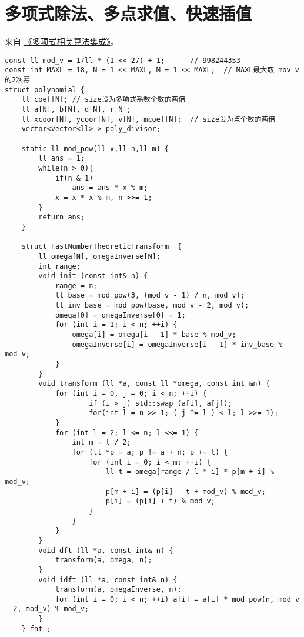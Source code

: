 \section{多项式除法、多点求值、快速插值}

\par 来自 \href{https://brooksj.com/2019/07/24/%E5%A4%9A%E9%A1%B9%E5%BC%8F%E7%9B%B8%E5%85%B3%E7%AE%97%E6%B3%95%E9%9B%86%E6%88%90/}{《多项式相关算法集成》}。

\begin{verbatim}
const ll mod_v = 17ll * (1 << 27) + 1;      // 998244353
const int MAXL = 18, N = 1 << MAXL, M = 1 << MAXL;  // MAXL最大取 mov_v 的2次幂
struct polynomial {
​    ll coef[N]; // size设为多项式系数个数的两倍
​    ll a[N], b[N], d[N], r[N];
​    ll xcoor[N], ycoor[N], v[N], mcoef[N];  // size设为点个数的两倍
​    vector<vector<ll> > poly_divisor;
​     
​    static ll mod_pow(ll x,ll n,ll m) {
​        ll ans = 1;
​        while(n > 0){
​            if(n & 1)
​                ans = ans * x % m;
​            x = x * x % m, n >>= 1;
​        }
​        return ans;
​    }
​     
​    struct FastNumberTheoreticTransform  {
​        ll omega[N], omegaInverse[N];
​        int range;
​        void init (const int& n) {
​            range = n;
​            ll base = mod_pow(3, (mod_v - 1) / n, mod_v);
​            ll inv_base = mod_pow(base, mod_v - 2, mod_v);
​            omega[0] = omegaInverse[0] = 1;
​            for (int i = 1; i < n; ++i) {
​                omega[i] = omega[i - 1] * base % mod_v;
​                omegaInverse[i] = omegaInverse[i - 1] * inv_base % mod_v;
​            }
​        }
​        void transform (ll *a, const ll *omega, const int &n) {
​            for (int i = 0, j = 0; i < n; ++i) {
​                    if (i > j) std::swap (a[i], a[j]);
​                    for(int l = n >> 1; ( j ^= l ) < l; l >>= 1);
​            }
​            for (int l = 2; l <= n; l <<= 1) {
​                int m = l / 2;
​                for (ll *p = a; p != a + n; p += l) {
​                    for (int i = 0; i < m; ++i) {
​                        ll t = omega[range / l * i] * p[m + i] % mod_v;
​                        p[m + i] = (p[i] - t + mod_v) % mod_v;
​                        p[i] = (p[i] + t) % mod_v;
​                    }
​                }
​            }
​        }
        void dft (ll *a, const int& n) {
            transform(a, omega, n);
        }
        void idft (ll *a, const int& n) {
            transform(a, omegaInverse, n);
            for (int i = 0; i < n; ++i) a[i] = a[i] * mod_pow(n, mod_v - 2, mod_v) % mod_v;
        }
    } fnt ;
    

\end{verbatim}
